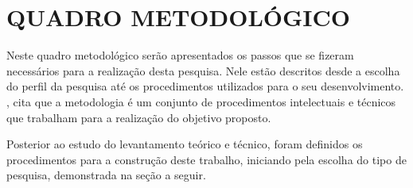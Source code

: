
\chapter{QUADRO METODOLÓGICO}
\label{cap:quadroMetodologico}


\par Neste quadro metodológico serão apresentados os passos que se fizeram necessários para a realização desta pesquisa. Nele estão descritos desde a escolha do perfil da pesquisa até os procedimentos utilizados para o seu desenvolvimento. , cita que a metodologia é um conjunto de procedimentos intelectuais e técnicos que trabalham para a realização do objetivo proposto.
\par Posterior ao estudo do levantamento teórico e técnico, foram definidos os procedimentos para a construção deste trabalho, iniciando pela escolha do tipo de pesquisa, demonstrada na seção a seguir.







%



%

%



%

%